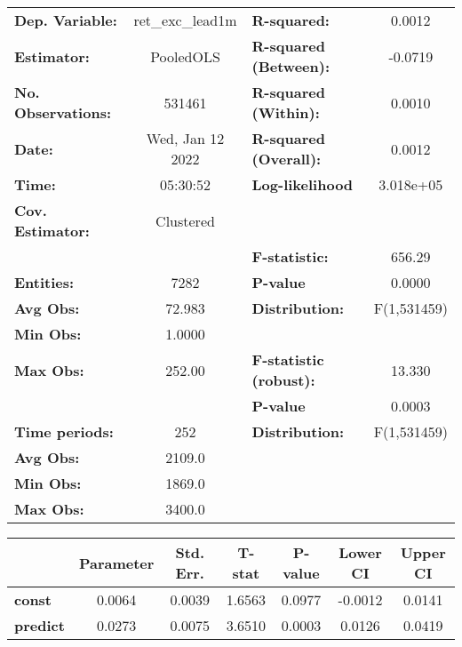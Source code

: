 \begin{center}
\begin{tabular}{lclc}
\toprule
\textbf{Dep. Variable:}    &  ret\_exc\_lead1m  & \textbf{  R-squared:         }   &      0.0012      \\
\textbf{Estimator:}        &     PooledOLS      & \textbf{  R-squared (Between):}  &     -0.0719      \\
\textbf{No. Observations:} &       531461       & \textbf{  R-squared (Within):}   &      0.0010      \\
\textbf{Date:}             &  Wed, Jan 12 2022  & \textbf{  R-squared (Overall):}  &      0.0012      \\
\textbf{Time:}             &      05:30:52      & \textbf{  Log-likelihood     }   &    3.018e+05     \\
\textbf{Cov. Estimator:}   &     Clustered      & \textbf{                     }   &                  \\
\textbf{}                  &                    & \textbf{  F-statistic:       }   &      656.29      \\
\textbf{Entities:}         &        7282        & \textbf{  P-value            }   &      0.0000      \\
\textbf{Avg Obs:}          &       72.983       & \textbf{  Distribution:      }   &   F(1,531459)    \\
\textbf{Min Obs:}          &       1.0000       & \textbf{                     }   &                  \\
\textbf{Max Obs:}          &       252.00       & \textbf{  F-statistic (robust):} &      13.330      \\
\textbf{}                  &                    & \textbf{  P-value            }   &      0.0003      \\
\textbf{Time periods:}     &        252         & \textbf{  Distribution:      }   &   F(1,531459)    \\
\textbf{Avg Obs:}          &       2109.0       & \textbf{                     }   &                  \\
\textbf{Min Obs:}          &       1869.0       & \textbf{                     }   &                  \\
\textbf{Max Obs:}          &       3400.0       & \textbf{                     }   &                  \\
\bottomrule
\end{tabular}
\begin{tabular}{lcccccc}
                 & \textbf{Parameter} & \textbf{Std. Err.} & \textbf{T-stat} & \textbf{P-value} & \textbf{Lower CI} & \textbf{Upper CI}  \\
\midrule
\textbf{const}   &       0.0064       &       0.0039       &      1.6563     &      0.0977      &      -0.0012      &       0.0141       \\
\textbf{predict} &       0.0273       &       0.0075       &      3.6510     &      0.0003      &       0.0126      &       0.0419       \\
\bottomrule
\end{tabular}
\end{center}
